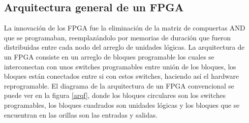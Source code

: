 \documentclass[twoside,spanish,ESP,MSc]{plantillaLabUPV}
\theoremstyle{definition}
\newcommand{\f}{FPGA }
\newcommand{\fs}{FPGAs }
\begin{document}


%
%
%
%
%
%


\subsection{Arquitectura general de un FPGA}
La innovación de los FPGA fue la eliminación de la matriz de compuertas AND que se programaban, reemplazándolo por memorias de duración que fueron distribuidas entre cada nodo del arreglo de unidades lógicas. La arquitectura de un \f consiste en un arreglo de bloques programable los cuales se interconectan con unos switches programables entre unión de los bloques, los bloques están conectados entre si con estos switches, haciendo así el hardware reprogramable. El diagrama de la arquitectura de un \f convencional se puede ver en la figura \ref{arqf}, donde los bloques circulares son los switches programables, los bloques cuadrados son unidades lógicas y los bloques que se encuentran en las orillas son las entradas y salidas. 
\end{document}
